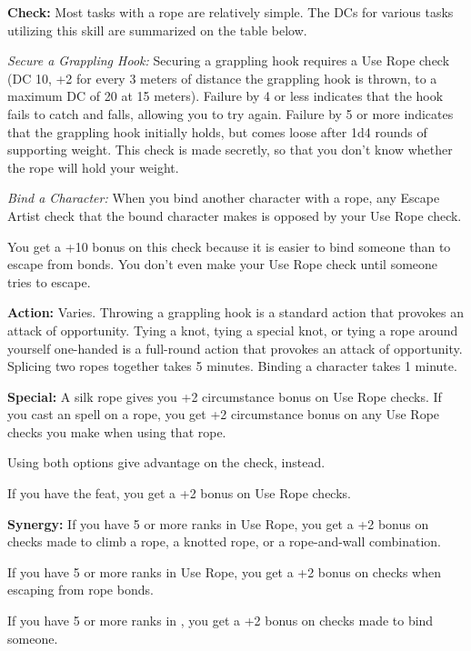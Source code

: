 \textbf{Check:} Most tasks with a rope are relatively simple. The DCs for various tasks utilizing this skill are summarized on the table below.


\textit{Secure a Grappling Hook:} Securing a grappling hook requires a Use Rope check (DC 10, +2 for every 3 meters of distance the grappling hook is thrown, to a maximum DC of 20 at 15 meters). Failure by 4 or less indicates that the hook fails to catch and falls, allowing you to try again. Failure by 5 or more indicates that the grappling hook initially holds, but comes loose after 1d4 rounds of supporting weight. This check is made secretly, so that you don't know whether the rope will hold your weight.

\textit{Bind a Character:} When you bind another character with a rope, any Escape Artist check that the bound character makes is opposed by your Use Rope check.

You get a +10 bonus on this check because it is easier to bind someone than to escape from bonds. You don't even make your Use Rope check until someone tries to escape.

\textbf{Action:} Varies. Throwing a grappling hook is a standard action that provokes an attack of opportunity. Tying a knot, tying a special knot, or tying a rope around yourself one-handed is a full-round action that provokes an attack of opportunity. Splicing two ropes together takes 5 minutes. Binding a character takes 1 minute.

\textbf{Special:} A silk rope gives you +2 circumstance bonus on Use Rope checks. If you cast an  spell on a rope, you get +2 circumstance bonus on any Use Rope checks you make when using that rope.

Using both options give advantage on the check, instead.

If you have the  feat, you get a +2 bonus on Use Rope checks.

\textbf{Synergy:} If you have 5 or more ranks in Use Rope, you get a +2 bonus on  checks made to climb a rope, a knotted rope, or a rope-and-wall combination.

If you have 5 or more ranks in Use Rope, you get a +2 bonus on  checks when escaping from rope bonds.

If you have 5 or more ranks in , you get a +2 bonus on checks made to bind someone.
